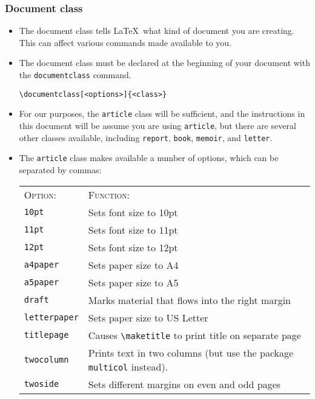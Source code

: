 \documentclass[11pt, letterpaper]{article}
\begin{document}
  \subsubsection{Document class}
  
    \begin{itemize}
      \item The document class tells \LaTeX\ what kind of document you are creating. This can affect various commands made available to you.
      
      \item The document class must be declared at the beginning of your document with the \verb|documentclass| command.
      
	\begin{exe}
	  \ex \verb!\documentclass[<options>]{<class>}! 
	\end{exe}

      
      \item For our purposes, the \verb|article| class will be sufficient, and the instructions in this document will be assume you are using \verb|article|, but there are several other classes available, including \verb|report|, \verb|book|, \verb|memoir|, and \verb|letter|.
      
      \item The \verb|article| class makes available a number of options, which can be separated by commas:
      
	\begin{exe}
	  \ex \begin{tabular}[t]{ll}
	        \textsc{Option}: 	& \textsc{Function}: \\
	        \verb|10pt| 		& Sets font size to 10pt \\
	        \verb|11pt| 		& Sets font size to 11pt \\
	        \verb|12pt| 		& Sets font size to 12pt \\
	        \verb|a4paper|		& Sets paper size to A4 \\
	        \verb|a5paper|		& Sets paper size to A5 \\
	        \verb|draft|		& Marks material that flows into the right margin \\
	        \verb|letterpaper| 	& Sets paper size to US Letter \\
	        \verb|titlepage|	& Causes \verb|\maketitle| to print title on separate page \\
		  \verb|twocolumn|	& Prints text in two columns (but use the package \verb|multicol| instead). \\
	        \verb|twoside|		& Sets different margins on even and odd pages \\
	      \end{tabular}


\end{exe}
\end{itemize}
\end{document}
